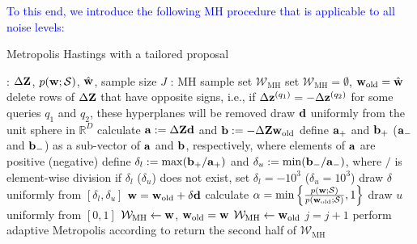 \documentclass[onecolumn,11pt]{article}
\newcommand{\highlight}[1]{{\textcolor{blue}{{#1}}}}
\newcommand{\highlight}[1]{{{#1}}}
\begin{document}
\highlight{To this end, we introduce the following MH procedure that is applicable to all noise levels:}
\begin{algorithm}
\caption{Metropolis Hastings with a tailored proposal}\label{alg:mh}
\begin{algorithmic}[1]
: $\Delta {\bf Z}$, $p({\bf w};\mathcal{S})$, $\hat{\bf w}$, sample size $J$
: MH sample set $\mathcal{W}_{\text{MH}}$
\State set $\mathcal{W}_{\text{MH}}=\emptyset$, ${\bf w}_{\text{old}} = \hat{\bf w}$
\State delete rows of $\Delta {\bf Z}$ that have opposite signs, i.e., if $\Delta {\bf z}^{(q_1)} = -\Delta {\bf z}^{(q_2)}$ for some queries $q_1$ and $q_2$, these hyperplanes will be removed
    \State draw ${\bf d}$ uniformly from the unit sphere in $\mathbb{R}^D$
    \State calculate ${\bf a} := \Delta {\bf Z}{\bf d}$ and ${\bf b} := -\Delta {\bf Z}{\bf w}_{\text{old}}$
    \State define ${\bf a}_+$ and ${\bf b}_+$ (${\bf a}_-$ and ${\bf b}_-$) as a sub-vector of ${\bf a}$ and ${\bf b}$, respectively, where elements of ${\bf a}$ are positive (negative) 
    \State define $\delta_l := \max({\bf b}_+/{\bf a}_+)$ and $\delta_u := \min({\bf b}_-/{\bf a}_-)$, where $/$ is element-wise division
    \State if $\delta_l$ ($\delta_u$) does not exist, set $\delta_l = -10^3$ ($\delta_u = 10^3$)
    \State draw $\delta$ uniformly from $[\delta_l, \delta_u]$
    \State ${\bf w} = {\bf w}_{\text{old}} + \delta {\bf d}$
    \State calculate $\alpha = \min\left\{\frac{p({\bf w};\mathcal{S})}{p({\bf w}_{\text{old}};\mathcal{S})},1\right\}$
    \State draw $u$ uniformly from $[0,1]$
        \State $\mathcal{W}_{\text{MH}} \leftarrow {\bf w}$, ${\bf w}_{\text{old}} = {\bf w}$
    \Else
        \State $\mathcal{W}_{\text{MH}} \leftarrow {\bf w}_{\text{old}}$
    \EndIf
    \State $j = j+1$
    \EndWhile
\Else
    \State perform adaptive Metropolis according to \cite{haario2001adaptive}
\EndIf
\State return the second half of $\mathcal{W}_{\text{MH}}$
\end{algorithmic}
\end{algorithm}
\end{document}
